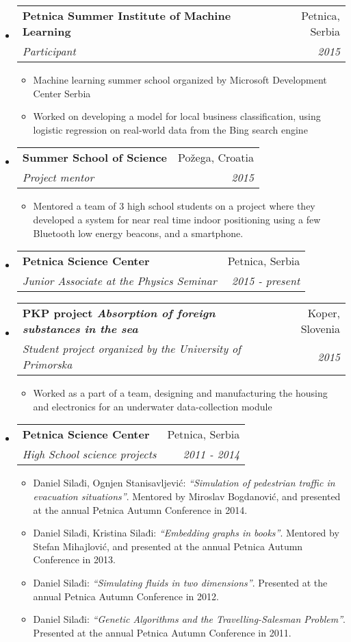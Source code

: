 \documentclass[a4paper]{article}
\makeatletter
\newcommand{\ressubheading}[4]{
\begin{tabular*}{6.5in}{l@{\cftdotfill{\cftsecdotsep}\extracolsep{\fill}}r}
		\textbf{#1} & #2 \\
		\textit{#3} & \textit{#4} \\
\end{tabular*}\vspace{-2pt}}
\makeatother
\begin{document}
\begin{itemize}
	\item \ressubheading{Petnica Summer Institute of Machine Learning}{Petnica, Serbia}{Participant}{2015}
	\begin{itemize}
		\item Machine learning summer school organized by Microsoft Development Center Serbia
		\item Worked on developing a model for local business classification, using logistic regression on real-world data from the Bing search engine
	\end{itemize}
	\item \ressubheading{Summer School of Science}{Požega, Croatia}{Project mentor}{2015}
	\begin{itemize}
		\item Mentored a team of 3 high school students on a project where they developed a system for near real time indoor positioning using a few Bluetooth low energy beacons, and a smartphone.
	\end{itemize}
	\item \ressubheading{Petnica Science Center}{Petnica, Serbia}{Junior Associate at the Physics Seminar}{2015 - present}
	\item \ressubheading{PKP project \emph{Absorption of foreign substances in the sea}}{Koper, Slovenia}{Student project organized by the University of Primorska}{2015}
	\begin{itemize}
		\item Worked as a part of a team, designing and manufacturing the housing and electronics for an underwater data-collection module
	\end{itemize}
	\item \ressubheading{Petnica Science Center}{Petnica, Serbia}{High School science projects}{2011 - 2014}
	\begin{itemize}
		\item Daniel Silađi, Ognjen Stanisavljević: \emph{``Simulation of pedestrian traffic in evacuation situations''}. Mentored by Miroslav Bogdanović, and presented at the annual Petnica Autumn Conference in 2014.
		\item Daniel Silađi, Kristina Silađi: \emph{``Embedding graphs in books''}. Mentored by Stefan Mihajlović, and presented at the annual Petnica Autumn Conference in 2013.
		\item Daniel Silađi: \emph{``Simulating fluids in two dimensions''}. Presented at the annual Petnica Autumn Conference in 2012.
		\item Daniel Silađi: \emph{``Genetic Algorithms and the Travelling-Salesman Problem''}. Presented at the annual Petnica Autumn Conference in 2011.

\end{itemize}
\end{itemize}
\end{document}
